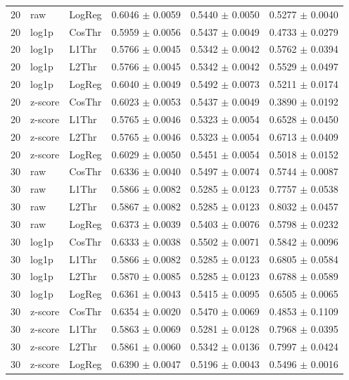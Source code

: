 \begin{longtable}{rllccc}
20 & raw & LogReg & 0.6046 $\pm$ 0.0059 & 0.5440 $\pm$ 0.0050 & 0.5277 $\pm$ 0.0040 \\
20 & log1p & CosThr & 0.5959 $\pm$ 0.0056 & 0.5437 $\pm$ 0.0049 & 0.4733 $\pm$ 0.0279 \\
20 & log1p & L1Thr & 0.5766 $\pm$ 0.0045 & 0.5342 $\pm$ 0.0042 & 0.5762 $\pm$ 0.0394 \\
20 & log1p & L2Thr & 0.5766 $\pm$ 0.0045 & 0.5342 $\pm$ 0.0042 & 0.5529 $\pm$ 0.0497 \\
20 & log1p & LogReg & 0.6040 $\pm$ 0.0049 & 0.5492 $\pm$ 0.0073 & 0.5211 $\pm$ 0.0174 \\
20 & z-score & CosThr & 0.6023 $\pm$ 0.0053 & 0.5437 $\pm$ 0.0049 & 0.3890 $\pm$ 0.0192 \\
20 & z-score & L1Thr & 0.5765 $\pm$ 0.0046 & 0.5323 $\pm$ 0.0054 & 0.6528 $\pm$ 0.0450 \\
20 & z-score & L2Thr & 0.5765 $\pm$ 0.0046 & 0.5323 $\pm$ 0.0054 & 0.6713 $\pm$ 0.0409 \\
20 & z-score & LogReg & 0.6029 $\pm$ 0.0050 & 0.5451 $\pm$ 0.0054 & 0.5018 $\pm$ 0.0152 \\
30 & raw & CosThr & 0.6336 $\pm$ 0.0040 & 0.5497 $\pm$ 0.0074 & 0.5744 $\pm$ 0.0087 \\
30 & raw & L1Thr & 0.5866 $\pm$ 0.0082 & 0.5285 $\pm$ 0.0123 & 0.7757 $\pm$ 0.0538 \\
30 & raw & L2Thr & 0.5867 $\pm$ 0.0082 & 0.5285 $\pm$ 0.0123 & 0.8032 $\pm$ 0.0457 \\
30 & raw & LogReg & 0.6373 $\pm$ 0.0039 & 0.5403 $\pm$ 0.0076 & 0.5798 $\pm$ 0.0232 \\
30 & log1p & CosThr & 0.6333 $\pm$ 0.0038 & 0.5502 $\pm$ 0.0071 & 0.5842 $\pm$ 0.0096 \\
30 & log1p & L1Thr & 0.5866 $\pm$ 0.0082 & 0.5285 $\pm$ 0.0123 & 0.6805 $\pm$ 0.0584 \\
30 & log1p & L2Thr & 0.5870 $\pm$ 0.0085 & 0.5285 $\pm$ 0.0123 & 0.6788 $\pm$ 0.0589 \\
30 & log1p & LogReg & 0.6361 $\pm$ 0.0043 & 0.5415 $\pm$ 0.0095 & 0.6505 $\pm$ 0.0065 \\
30 & z-score & CosThr & 0.6354 $\pm$ 0.0020 & 0.5470 $\pm$ 0.0069 & 0.4853 $\pm$ 0.1109 \\
30 & z-score & L1Thr & 0.5863 $\pm$ 0.0069 & 0.5281 $\pm$ 0.0128 & 0.7968 $\pm$ 0.0395 \\
30 & z-score & L2Thr & 0.5861 $\pm$ 0.0060 & 0.5342 $\pm$ 0.0136 & 0.7997 $\pm$ 0.0424 \\
30 & z-score & LogReg & 0.6390 $\pm$ 0.0047 & 0.5196 $\pm$ 0.0043 & 0.5496 $\pm$ 0.0016 \\

\end{longtable}
